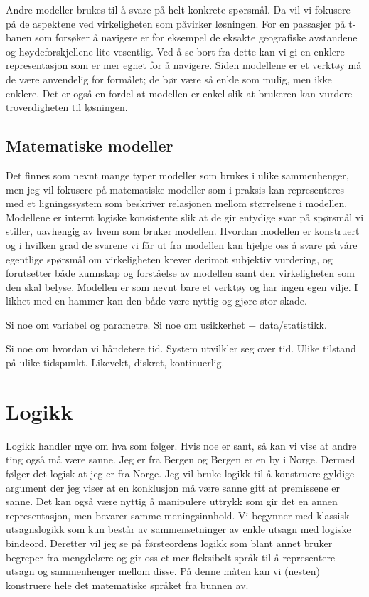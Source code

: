 Andre modeller brukes til å svare på helt konkrete spørsmål. Da vil vi fokusere på de aspektene ved virkeligheten som påvirker løsningen. For en passasjer på t-banen som forsøker å navigere er for eksempel de eksakte geografiske avstandene og høydeforskjellene lite vesentlig. Ved å se bort fra dette kan vi gi en enklere representasjon som er mer egnet for å navigere. Siden modellene er et verktøy må de være anvendelig for formålet; de bør være så enkle som mulig, men ikke enklere. Det er også en fordel at modellen er enkel slik at brukeren kan vurdere troverdigheten til løsningen.
\subsection{Matematiske modeller}
Det finnes som nevnt mange typer modeller som brukes i ulike sammenhenger, men jeg vil fokusere på matematiske modeller som i praksis kan representeres med et ligningssystem som beskriver relasjonen mellom størrelsene i modellen. Modellene er internt logiske konsistente slik at de gir entydige svar på spørsmål vi stiller, uavhengig av hvem som bruker modellen. Hvordan modellen er konstruert og i hvilken grad de svarene vi får ut fra modellen kan hjelpe oss å svare på våre egentlige spørsmål om virkeligheten krever derimot subjektiv vurdering, og forutsetter både kunnskap og forståelse av modellen samt den virkeligheten som den skal belyse. Modellen er som nevnt bare et verktøy og har ingen egen vilje. I likhet med en hammer kan den både være nyttig og gjøre stor skade. 

Si noe om variabel og parametre. Si noe om usikkerhet + data/statistikk.

Si noe om hvordan vi håndetere tid. System utvilkler seg over tid. Ulike tilstand på ulike tidspunkt. Likevekt, diskret, kontinuerlig. 
\section{Logikk}
Logikk handler mye om hva som følger. Hvis noe er sant, så kan vi vise at andre ting også må være sanne. Jeg er fra Bergen og Bergen er en by i Norge. Dermed følger det logisk at jeg er fra Norge. Jeg vil bruke logikk til å konstruere gyldige argument der jeg viser at en konklusjon må være sanne gitt at premissene er sanne. Det kan også være nyttig å manipulere uttrykk som gir det en annen representasjon, men bevarer samme meningsinnhold. Vi begynner med klassisk utsagnslogikk som kun består av sammensetninger av enkle utsagn med logiske bindeord. Deretter vil jeg se på førsteordens logikk som blant annet bruker begreper fra mengdelære og gir oss et mer fleksibelt språk til å representere utsagn og sammenhenger mellom disse. På denne måten kan vi (nesten) konstruere hele det matematiske språket fra bunnen av.
